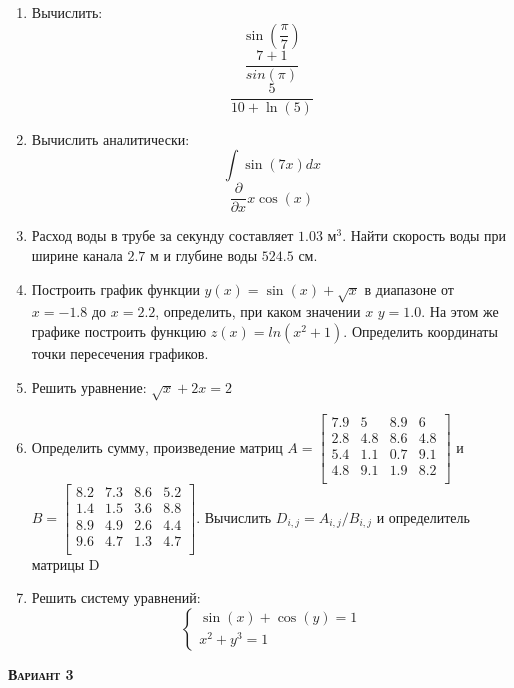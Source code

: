 \begin{enumerate}
\item Вычислить: 
\begin{equation*}\sin \left( \dfrac{\pi}{7} \right)\end{equation*}
\begin{equation*}\dfrac{7+1}{sin(\pi)}             \end{equation*}
\begin{equation*}\dfrac{5}{10+\ln(5)}              \end{equation*}

\item Вычислить аналитически: 
 \begin{equation*} \int \sin(7x) dx           \end{equation*}\begin{equation*} \dfrac{\partial} {\partial x} x\cos(x)              \end{equation*}


\item Расход воды в трубе за секунду составляет $1.03$ $\text{м}^3$. Найти скорость воды при ширине канала $2.7$ м и глубине воды $524.5$ см.

\item Построить график функции $y(x)=\sin(x)+\sqrt{x}      $ в диапазоне от $x=-1.8$ до $x=2.2$, определить, при каком значении $x$ $y=1.0$. На этом же графике построить функцию $z(x)=ln(x^2+1)                 $. Определить координаты точки пересечения графиков. \item Решить уравнение: $\sqrt{x}+2x=2        $

\item Определить сумму, произведение матриц $A=\begin{bmatrix}
7.9 &5 &8.9 &6 \\
2.8 &4.8 &8.6 &4.8 \\
5.4 &1.1 &0.7 &9.1 \\
4.8 &9.1 &1.9 &8.2 \\
\end{bmatrix}
$ и $B=\begin{bmatrix}
8.2 &7.3 &8.6 &5.2 \\
1.4 &1.5 &3.6 &8.8 \\
8.9 &4.9 &2.6 &4.4 \\
9.6 &4.7 &1.3 &4.7 \\
\end{bmatrix}
$. Вычислить $D_{i,j}=A_{i,j}  /  B_{i,j}$ и определитель матрицы D

\item Решить систему уравнений: \begin{equation*} \begin{cases} \sin(x)+\cos(y)=1    \\ x^2 + y^3=1               \end{cases} \end{equation*} 

\end{enumerate}
\textsc{\textbf{Вариант 3}}

